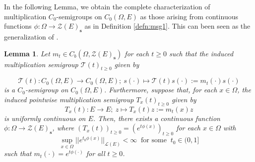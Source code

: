 \documentclass{article}
\newtheorem{lemma}{Lemma}
\newcommand{\Bm}[1]{ \boldsymbol{ #1 }}
\newcommand{\sL}{\mathscr{L}}
\newcommand{\mZ}{\mathcal{Z}}
\newcommand{\mT}{\mathcal{T}}
\newcommand{\ty}{\infty}
\newcommand{\cd}{\cdot}
\newcommand{\lo}{\longrightarrow}
\newcommand{\Om}{\Omega}
\newcommand{\mt}{\mapsto}
\begin{document}
 In the following Lemma, we obtain the complete characterization of multiplication $C_0$-semigroups on $ C_0(\Om, E)$ as those arising from continuous functions $\phi : \Om \lo  \Bm{\mZ}(E)_\textbf{s}$ as in Definition \ref{defn:msg1}.  This can been seen as the generalization of   \cite[Proposition 3.6, p.24-25]{engel2006short}. 
 \begin{lemma}\label{lem:msg2}
 	Let  $m_t\in C_b(\Om, \Bm{\mZ}(E)_\textbf{s})$ for each $t\ge0$ such that the induced multiplication semigroup $\mT(t)_{t\ge0}$ given by
 	
 	\[ \mT(t) : C_0(\Om, E) \lo C_0(\Om, E);\ s(\cd)\mt \mT(t)s(\cd):=m_t(\cd)s(\cd)     \]
 	is a $C_0$-semigroup on $C_0(\Om, E)$. Furthermore, suppose that, for each $x\in\Om$, the induced pointwise multiplication semigroup $T_x(t)_{t\ge0}$ given by
 	\[T_x(t): E \lo E;\ z\mt T_x(t)z:=m_t(x)z    \]
 	is uniformly continuous on $E$. Then, there exists a continuous function $\phi : \Om \lo  \Bm{\mZ}(E)_\textbf{s}$, where $(T_x(t))_{t\ge0}= (e^{t\phi(x)})_{t\ge0}$ for each $x\in\Om$ with
 	\[\sup_{x\in\Om}||e^{t_0\phi(x)}||_{\sL(E)}<\ty \ \text{ for some }\ t_0\in (0,1]  \]
 	such that $m_t(\cd)= e^{t\phi(\cd)}$ for all $t\ge0$.
 \end{lemma}
\end{document}
